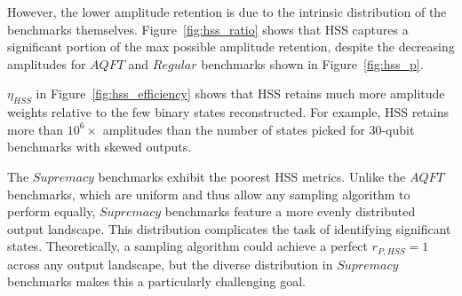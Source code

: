 However,
the lower amplitude retention is due to the intrinsic distribution of the benchmarks themselves.
Figure~\ref{fig:hss_ratio} shows that HSS captures a significant portion of the max possible amplitude retention,
despite the decreasing amplitudes for $AQFT$ and $Regular$ benchmarks shown in Figure~\ref{fig:hss_p}.

$\eta_{HSS}$ in Figure~\ref{fig:hss_efficiency}
shows that HSS retains much more amplitude weights relative to the few binary states reconstructed.
For example, HSS retains more than $10^6\times$ amplitudes than the number of states picked for $30$-qubit benchmarks with skewed outputs.

The $Supremacy$ benchmarks exhibit the poorest HSS metrics.
Unlike the $AQFT$ benchmarks,
which are uniform and thus allow any sampling algorithm to perform equally,
$Supremacy$ benchmarks feature a more evenly distributed output landscape.
This distribution complicates the task of identifying significant states.
Theoretically, a sampling algorithm could achieve a perfect $r_{P,HSS}=1$ across any output landscape,
but the diverse distribution in $Supremacy$ benchmarks makes this a particularly challenging goal.